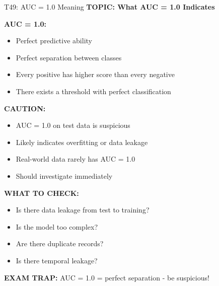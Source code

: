 \documentclass[8pt]{beamer}
\begin{document}
	\begin{frame}{T49: AUC = 1.0 Meaning}
		\fontsize{6.5}{7.5}\selectfont
		\textbf{TOPIC: What AUC = 1.0 Indicates}
		
		\vspace{0.1cm}
		\textbf{AUC = 1.0:}
		\begin{itemize}
			\item Perfect predictive ability
			\item Perfect separation between classes
			\item Every positive has higher score than every negative
			\item There exists a threshold with perfect classification
		\end{itemize}
		
		\vspace{0.1cm}
		\textbf{CAUTION:}
		\begin{itemize}
			\item AUC = 1.0 on test data is suspicious
			\item Likely indicates overfitting or data leakage
			\item Real-world data rarely has AUC = 1.0
			\item Should investigate immediately
		\end{itemize}
		
		\vspace{0.1cm}
		\textbf{WHAT TO CHECK:}
		\begin{itemize}
			\item Is there data leakage from test to training?
			\item Is the model too complex?
			\item Are there duplicate records?
			\item Is there temporal leakage?
		\end{itemize}
		
		\textcolor{myred}{\textbf{EXAM TRAP:}} AUC = 1.0 = \textcolor{myblue}{perfect separation} - be suspicious!
	\end{frame}
	
\end{document}
